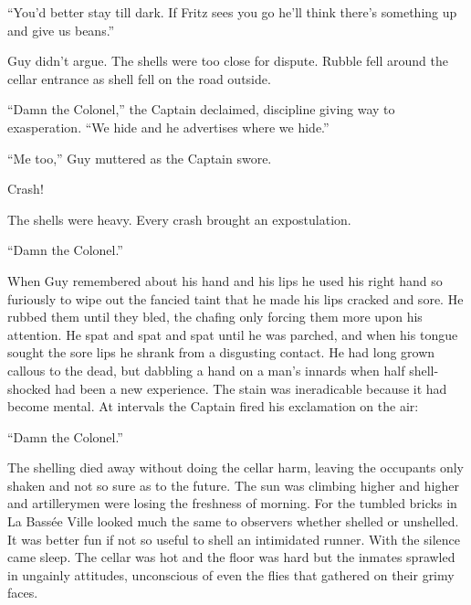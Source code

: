``You'd better stay till dark. If Fritz sees you go he'll think there's something up and give us beans.''

Guy didn't argue. The shells were too close for dispute. Rubble fell around the cellar entrance as shell fell on the road outside.

``Damn the Colonel,'' the Captain declaimed, discipline giving way to exasperation. ``We hide and he advertises where we hide.''

``Me too,'' Guy muttered as the Captain swore.

Crash!

The shells were heavy. Every crash brought an expostulation.

``Damn the Colonel.''

When Guy remembered about his hand and his lips he used his right hand so furiously to wipe out the fancied taint that he made his lips cracked and sore. He rubbed them until they bled, the chafing only forcing them more upon his attention. He spat and spat and spat until he was parched, and when his tongue sought the sore lips he shrank from a disgusting contact. He had long grown callous to the dead, but dabbling a hand on a man's innards when half shell-shocked had been a new experience. The stain was ineradicable because it had become mental. At intervals the Captain fired his exclamation on the air:

``Damn the Colonel.''

The shelling died away without doing the cellar harm, leaving the occupants only shaken and not so sure as to the future. The sun was climbing higher and higher and artillerymen were losing the freshness of morning. For the tumbled bricks in La Bass\'{e}e Ville looked much the same to observers whether shelled or unshelled. It was better fun if not so useful to shell an intimidated runner. With the silence came sleep. The cellar was hot and the floor was hard but the inmates sprawled in ungainly attitudes, unconscious of even the flies that gathered on their grimy faces.
